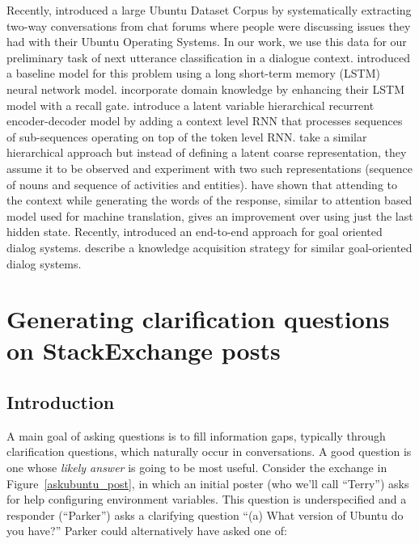 \documentclass[11pt]{report}
\renewcommand\cite{\citep}	%
\begin{document}
Recently, \cite{lowe2015ubuntu} introduced a large Ubuntu Dataset Corpus by systematically extracting two-way conversations from chat forums where people were discussing issues they had with their Ubuntu Operating Systems. In our work, we use this data for our preliminary task of next utterance classification in a dialogue context. \cite{lowe2015ubuntu}  introduced a baseline model for this problem using a long short-term memory (LSTM) neural network model. \cite{xu2016incorporating} incorporate domain knowledge by enhancing their LSTM model with a recall gate. \cite{serban2016hierarchical} introduce a latent variable hierarchical recurrent encoder-decoder model by adding a context level RNN that processes sequences of sub-sequences operating on top of the token level RNN. \cite{serban2016multiresolution} take a similar hierarchical approach but instead of defining a latent coarse representation, they assume it to be observed and experiment with two such representations (sequence of nouns and sequence of activities and entities). \cite{yao2016attentional} have shown that attending to the context while generating the words of the response, similar to attention based model used for machine translation, gives an improvement over using just the last hidden state. Recently, \cite{bordes2016learning} introduced an end-to-end approach for goal oriented dialog systems. \cite{pappu2014knowledge} describe a knowledge acquisition strategy for similar goal-oriented dialog systems. 

\newpage

\chapter{Generating clarification questions on StackExchange posts}\label{stackexchange}

\section{Introduction}\label{introduction}

A main goal of asking questions is to fill information gaps, typically through clarification questions, which naturally occur in conversations. 
A good question is one whose \emph{likely answer} is going to be most useful.
Consider the exchange in Figure~\ref{askubuntu_post}, in which an initial poster (who we'll call ``Terry'') asks for help configuring environment variables.
This question is underspecified and a responder (``Parker'') asks a clarifying question ``\textsf{\small (a) What version of Ubuntu do you have?}''
Parker could alternatively have asked one of:
\end{document}
